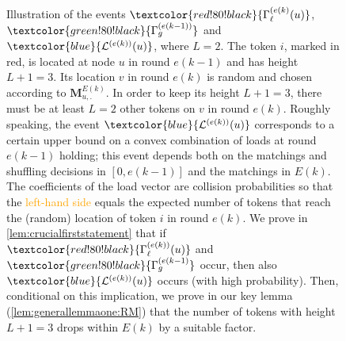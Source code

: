 \documentclass[twoside,leqno]{article}
\newcommand{\M}{\mathbf{M}}
\DeclareMathOperator{\1}{\mathbf{1}}
\numberwithin{equation}{section}
\let\epsilon\varepsilon
\begin{document}
\begin{figure}[H]
\begin{center}

\caption{Illustration of the events $\textcolor{red!80!black}{\Gamma_{\ell}^{(e(k)}(u)}$, $\textcolor{green!80!black}{\Gamma_{g}^{(e(k-1))}}$ and $ \textcolor{blue}{\mathcal{L}^{(e(k))}(u)}$, where $L=2$. The token $i$, marked in red, is located at node $u$ in round $e(k-1)$ and has height $L+1=3$. 
Its location $v$ in round $e(k)$ is random and chosen according to $\M_{u,.}^{E(k)}$. In order to keep its height $L+1=3$, there must be at least $L=2$ other tokens on $v$ in round $e(k)$. \newline
Roughly speaking, the event $ \textcolor{blue}{\mathcal{L}^{(e(k))}(u)}$ corresponds to a certain upper bound on a convex combination of loads at round $e(k-1)$ holding; this event depends both on the matchings and shuffling decisions in $[0,e(k-1)]$ and the matchings in $E(k)$.
The coefficients of the load vector are collision probabilities so that the \textcolor{orange}{left-hand side} equals the expected number of tokens that reach the (random) location of token $i$ in round $e(k)$.
\newline
We prove in \cref{lem:crucialfirststatement} that if $\textcolor{red!80!black}{\Gamma_{\ell}^{(e(k))}(u)}$ and $\textcolor{green!80!black}{\Gamma_{g}^{(e(k-1)}}$ occur, then also $ \textcolor{blue}{\mathcal{L}^{(e(k))}(u)}$ occurs (with high probability). Then, conditional on this implication, we prove in our key lemma (\cref{lem:generallemmaone:RM}) that the number of tokens with height $L+1=3$ drops within $E(k)$ by a suitable factor.
}\label{fig:events}
\end{center}
\end{figure}
\end{document}
